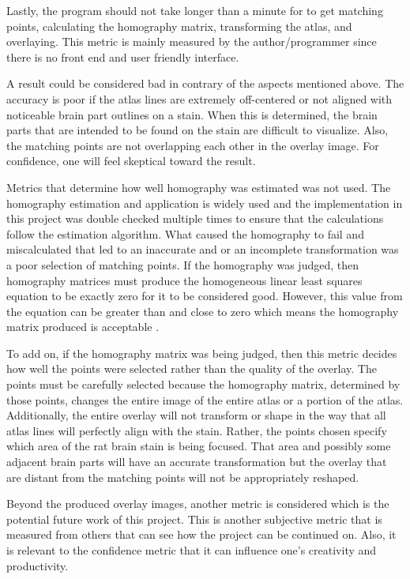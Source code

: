 \documentclass[10pt,twocolumn]{article}
\begin{document}
Lastly, the program should not take longer than a minute for to get matching points, calculating the homography matrix, transforming the atlas, and overlaying. This metric is mainly measured by the author/programmer since there is no front end and user friendly interface.

A result could be considered bad in contrary of the aspects mentioned above. The accuracy is poor if the atlas lines are extremely off-centered or not aligned with noticeable brain part outlines on a stain. When this is determined, the brain parts that are intended to be found on the stain are difficult to visualize. Also, the matching points are not overlapping each other in the overlay image. For confidence, one will feel skeptical toward the result. 

Metrics that determine how well homography was estimated was not used. The homography estimation and application is widely used and the implementation in this project was double checked multiple times to ensure that the calculations follow the estimation algorithm. What caused the homography to fail and miscalculated that led to an inaccurate and or an incomplete transformation was a poor selection of matching points. If the homography was judged, then homography matrices must produce the homogeneous linear least squares equation to be exactly zero for it to be considered good. However, this value from the equation can be greater than and close to zero which means the homography matrix produced is acceptable \cite{lect_y}.

To add on, if the homography matrix was being judged, then this metric decides how well the points were selected rather than the quality of the overlay. The points must be carefully selected because the homography matrix, determined by those points, changes the entire image of the entire atlas or a portion of the atlas. Additionally, the entire overlay will not transform or shape in the way that all atlas lines will perfectly align with the stain. Rather, the points chosen specify which area of the rat brain stain is being focused. That area and possibly some adjacent brain parts will have an accurate transformation but the overlay that are distant from the matching points will not be appropriately reshaped. 

Beyond the produced overlay images, another metric is considered which is the potential future work of this project. This is another subjective metric that is measured from others that can see how the project can be continued on. Also, it is relevant to the confidence metric that it can influence one's creativity and productivity. 
\end{document}

